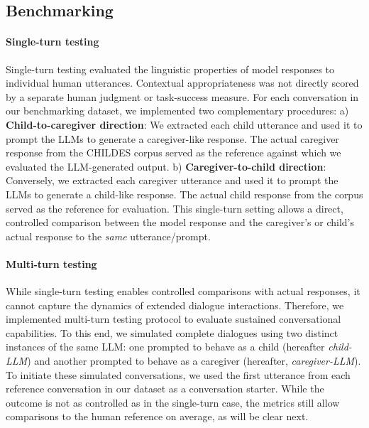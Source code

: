 \subsection{Benchmarking}  
\paragraph{Single-turn testing} 

Single-turn testing evaluated the linguistic properties of model responses to individual human utterances. Contextual appropriateness was not directly scored by a separate human judgment or task-success measure. For each conversation in our benchmarking dataset, we implemented two complementary procedures: a) \textbf{Child-to-caregiver direction}: We extracted each child utterance and used it to prompt the LLMs to generate a caregiver-like response. The actual caregiver response from the CHILDES corpus served as the reference against which we evaluated the LLM-generated output. b) \textbf{Caregiver-to-child direction}: Conversely, we extracted each caregiver utterance and used it to prompt the LLMs to generate a child-like response. The actual child response from the corpus served as the reference for evaluation. This single-turn setting allows a direct, controlled comparison between the model response and the caregiver's or child's actual response to the \textit{same} utterance/prompt.


\paragraph{Multi-turn testing}  While single-turn testing enables controlled comparisons with actual responses, it cannot capture the dynamics of extended dialogue interactions. Therefore, we implemented multi-turn testing protocol to evaluate sustained conversational capabilities. To this end, we simulated complete dialogues using two distinct instances of the same LLM: one prompted to behave as a child (hereafter \textit{child-LLM}) and another prompted to behave as a caregiver (hereafter, \textit{caregiver-LLM}). To initiate these simulated conversations, we used the first utterance from each reference conversation in our dataset as a conversation starter. While the outcome is not as controlled as in the single-turn case, the metrics still allow comparisons to the human reference on average, as will be clear next.







